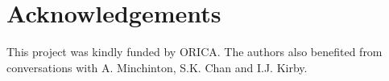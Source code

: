 \documentclass[3p,times,twocolumn]{elsarticle}
\begin{document}
\section*{Acknowledgements}
This project was kindly funded by ORICA. The authors also benefited from conversations with A. Minchinton, S.K. Chan
and I.J. Kirby.

\end{document}
